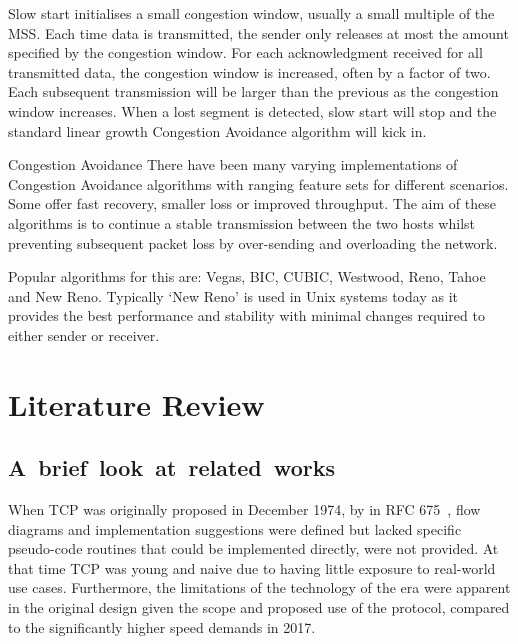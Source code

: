 \documentclass[11pt,a4paper,british]{bhamarticle}
\makeatletter
\newcounter{subsubsubsection}[subsubsection]
\newcommand\subsubsubsection{%
    \@startsection{subsubsubsection}{4}
        {\z@}{1.4\parskip}{0.2\parskip}
        {\normalfont\normalsize\bfseries}
}
\makeatother
\begin{document}
\begin{multicols}{2}
Slow start initialises a small congestion window, usually a small multiple of the MSS\@. Each time data is transmitted, the sender only releases at most the amount specified by the congestion window. For each acknowledgment received for all transmitted data, the congestion window is increased, often by a factor of two. Each subsequent transmission will be larger than the previous as the congestion window increases. When a lost segment is detected, slow start will stop and the standard linear growth Congestion Avoidance algorithm will kick in.

\subsubsubsection{Congestion Avoidance}
There have been many varying implementations of Congestion Avoidance algorithms with ranging feature sets for different scenarios. Some offer fast recovery, smaller loss or improved throughput. The aim of these algorithms is to continue a stable transmission between the two hosts whilst preventing subsequent packet loss by over-sending and overloading the network.

Popular algorithms for this are: Vegas, BIC, CUBIC, Westwood, Reno, Tahoe and New Reno. Typically `New Reno' is used in Unix systems today as it provides the best performance and stability with minimal changes required to either sender or receiver.


\section{Literature Review}
\subsection{\mbox{A brief look at related works}}
When TCP was originally proposed in December 1974, by \citeauthor{rfc675} in RFC 675~\cite{rfc675}, flow diagrams and implementation suggestions were defined but lacked specific pseudo-code routines that could be implemented directly, were not provided. At that time TCP was young and naive due to having little exposure to real-world use cases. Furthermore, the limitations of the technology of the era were apparent in the original design given the scope and proposed use of the protocol, compared to the significantly higher speed demands in 2017.


\end{multicols}
\end{document}

